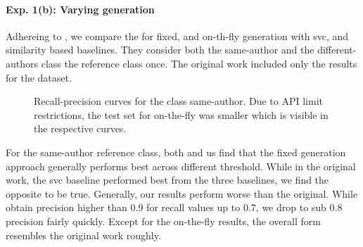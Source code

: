 \paragraph{Exp. 1(b): Varying \imp{} generation}

Adhereing to \citet{koppel_determining_2014}, we compare the \impAppr{} for fixed, and on-th-fly \imp{} generation with \ac{svc}, and similarity based baselines.
They consider both the same-author and the different-authors class the reference class once.
The original work included only the results for the \dataBlog{} dataset.

\begin{figure}[htbp]
  \centering
  \begin{subfigure}[b]{0.495\textwidth}
    \centering
    
    \caption{\dataBlog{}}
    \label{fig:blog_same_author}
  \end{subfigure}
  \hfill
  \begin{subfigure}[b]{0.495\textwidth}
    \centering
    
    \caption{\dataStudent{}}
    \label{fig:student_essays_same_author}
  \end{subfigure}
  \caption{Recall-precision curves for the class same-author. Due to API limit restrictions, the test set for on-the-fly was smaller which is visible in the respective curves.}
  \label{fig:same_authors}
\end{figure}

For the same-author reference class, both \citet{koppel_determining_2014} and us find that the fixed \imp{} generation approach generally performs best across different threshold.
While in the original work, the \ac{svc} baseline performed best from the three baselines, we find the opposite to be true.
Generally, our results perform worse than the original. 
While \citet{koppel_determining_2014} obtain precision higher than $0.9$ for recall values up to $0.7$, we drop to sub $0.8$ precision fairly quickly.
Except for the on-the-fly results, the overall form resembles the original work roughly.

